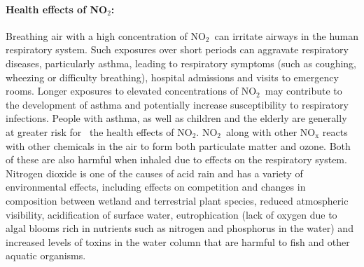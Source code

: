 \documentclass[a4paper,12pt,reqno]{article}
\begin{document}
    \paragraph{Health effects of NO$_2$:}
    Breathing air with a high concentration of NO$_2$ can 
    irritate airways in the human respiratory system. Such 
    exposures over short periods can aggravate respiratory 
    diseases, particularly asthma, leading to respiratory 
    symptoms (such as coughing, wheezing or difficulty 
    breathing), hospital admissions and visits to emergency 
    rooms. Longer exposures to elevated concentrations of 
    NO$_2$ may contribute to the development of asthma and 
    potentially increase susceptibility to respiratory 
    infections. People with asthma, as well as children and 
    the elderly are generally at greater risk for  the 
    health effects of NO$_2$.
    NO$_2$ along with other NO$_{\mathrm{x}}$ reacts with 
    other chemicals in the air to form both particulate 
    matter and ozone. Both of these are also harmful when 
    inhaled due to effects on the respiratory system.\\
    Nitrogen dioxide is one of the causes of acid rain 
    and has a variety of environmental effects, including 
    effects on competition and changes in composition 
    between wetland and terrestrial plant species, 
    reduced atmospheric visibility, acidification of 
    surface water, eutrophication (lack of oxygen due 
    to algal blooms rich in nutrients such as nitrogen 
    and phosphorus in the water) and increased levels 
    of toxins in the water column that are harmful to 
    fish and other aquatic organisms.

\vspace{-0.5cm}
\end{document}
